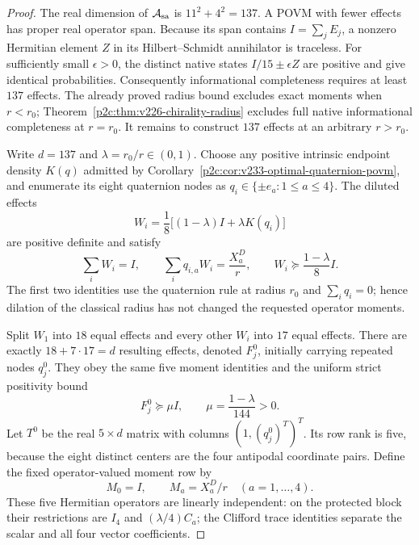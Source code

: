 \documentclass[12pt,a4paper]{article}
\begin{document}
\begin{proof}
The real dimension of $\mathcal A_{\rm sa}$ is
$11^2+4^2=137$. A POVM with fewer effects has proper real operator span.
Because its span contains $I=\sum_jE_j$, a nonzero Hermitian element
$Z$ in its Hilbert--Schmidt annihilator is traceless. For sufficiently
small $\epsilon>0$, the distinct native states
$I/15\pm\epsilon Z$ are positive and give identical probabilities.
Consequently informational completeness requires at least $137$ effects.
The already proved radius bound excludes exact moments when $r<r_0$;
Theorem~\ref{p2c:thm:v226-chirality-radius} excludes full native
informational completeness at $r=r_0$. It remains to construct $137$
effects at an arbitrary $r>r_0$.

Write $d=137$ and $\lambda=r_0/r\in(0,1)$. Choose any positive intrinsic
endpoint density $K(q)$ admitted by
Corollary~\ref{p2c:cor:v233-optimal-quaternion-povm}, and enumerate its
eight quaternion nodes as $q_i\in\{\pm e_a:1\le a\le4\}$. The diluted
effects
\[
 W_i=\frac18\bigl[(1-\lambda)I+\lambda K(q_i)\bigr]
\]
are positive definite and satisfy
\[
 \sum_iW_i=I,\qquad
 \sum_iq_{i,a}W_i=\frac{X_a^D}{r},\qquad
 W_i\succeq\frac{1-\lambda}{8}I.
\]
The first two identities use the quaternion rule at radius $r_0$ and
$\sum_iq_i=0$; hence dilation of the classical radius has not changed
the requested operator moments.

Split $W_1$ into $18$ equal effects and every other $W_i$ into $17$ equal
effects. There are exactly $18+7\cdot17=d$ resulting effects, denoted
$F_j^0$, initially carrying repeated nodes $q_j^0$. They obey the same
five moment identities and the uniform strict positivity bound
\[
 F_j^0\succeq\mu I,\qquad \mu=\frac{1-\lambda}{144}>0.
\]
Let $T^0$ be the real $5\times d$ matrix with columns
$(1,(q_j^0)^T)^T$. Its row rank is five, because the eight distinct
centers are the four antipodal coordinate pairs. Define the fixed
operator-valued moment row by
\[
 M_0=I,\qquad M_a=X_a^D/r\quad(a=1,\ldots,4).
\]
These five Hermitian operators are linearly independent: on the protected
block their restrictions are $I_4$ and $(\lambda/4)C_a$; the Clifford
trace identities separate the scalar and all four vector coefficients.


\end{proof}
\end{document}
